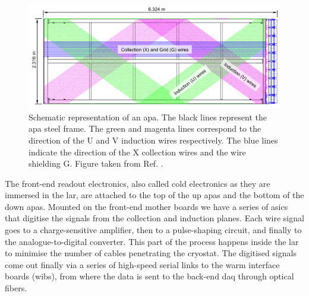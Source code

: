 \begin{figure}[t]
	\centering
	\includegraphics[width=1\linewidth]{Images/DUNE/FD/APA_wires}
	\caption[Schematic representation of an \gls{apa} frames showing the U, V, X and G wires.]{Schematic representation of an \gls{apa}. The black lines represent the \gls{apa} steel frame. The green and magenta lines correspond to the direction of the U and V induction wires respectively. The blue lines indicate the direction of the X collection wires and the wire shielding G. Figure taken from Ref. \cite{DUNE2020TDR1}.}
	\label{fig:apa}
\end{figure}

The front-end readout electronics, also called cold electronics as they are immersed in the \gls{lar}, are attached to the top of the up \gls{apa}s and the bottom of the down \gls{apa}s. Mounted on the front-end mother boards we have a series of \gls{asic}s that digitise the signals from the collection and induction planes. Each wire signal goes to a charge-sensitive amplifier, then to a pulse-shaping circuit, and finally to the analogue-to-digital converter. This part of the process happens inside the \gls{lar} to minimise the number of cables penetrating the cryostat. The digitised signals come out finally via a series of high-speed serial links to the warm interface boards (\gls{wib}s), from where the data is sent to the back-end \gls{daq} through optical fibers.

